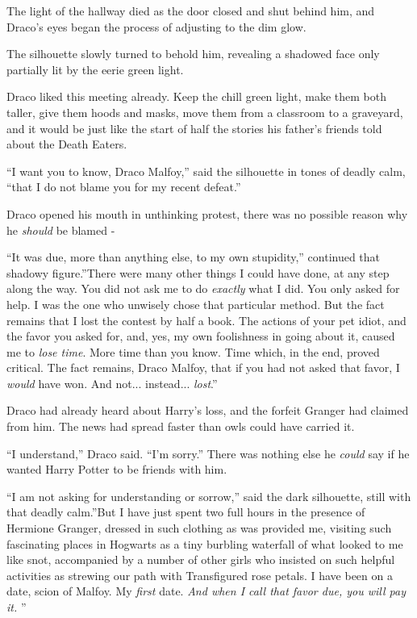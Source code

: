 The light of the hallway died as the door closed and shut behind him,
and Draco's eyes began the process of adjusting to the dim glow.

The silhouette slowly turned to behold him, revealing a shadowed face
only partially lit by the eerie green light.

Draco liked this meeting already. Keep the chill green light, make them
both taller, give them hoods and masks, move them from a classroom to a
graveyard, and it would be just like the start of half the stories his
father's friends told about the Death Eaters.

``I want you to know, Draco Malfoy,'' said the silhouette in tones of
deadly calm, ``that I do not blame you for my recent defeat.''

Draco opened his mouth in unthinking protest, there was no possible
reason why he \emph{should} be blamed -

``It was due, more than anything else, to my own stupidity,'' continued
that shadowy figure.''There were many other things I could have done, at
any step along the way. You did not ask me to do \emph{exactly} what I
did. You only asked for help. I was the one who unwisely chose that
particular method. But the fact remains that I lost the contest by half
a book. The actions of your pet idiot, and the favor you asked for, and,
yes, my own foolishness in going about it, caused me to \emph{lose
time}. More time than you know. Time which, in the end, proved critical.
The fact remains, Draco Malfoy, that if you had not asked that favor, I
\emph{would} have won. And not... instead... \emph{lost}.''

Draco had already heard about Harry's loss, and the forfeit Granger had
claimed from him. The news had spread faster than owls could have
carried it.

``I understand,'' Draco said. ``I'm sorry.'' There was nothing else he
\emph{could} say if he wanted Harry Potter to be friends with him.

``I am not asking for understanding or sorrow,'' said the dark
silhouette, still with that deadly calm.''But I have just spent two full
hours in the presence of Hermione Granger, dressed in such clothing as
was provided me, visiting such fascinating places in Hogwarts as a tiny
burbling waterfall of what looked to me like snot, accompanied by a
number of other girls who insisted on such helpful activities as
strewing our path with Transfigured rose petals. I have been on a date,
scion of Malfoy. My \emph{first} date. \emph{And when I call that favor
due, you will pay it.} ''

